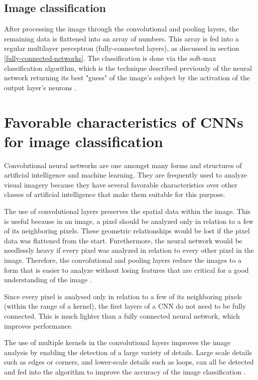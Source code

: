 \documentclass[12pt,a4paper,notitlepage]{article}
\begin{document}
\subsection{Image classification}
After processing the image through the convolutional and pooling layers, the remaining data is flattened into an array of numbers. This array is fed into a regular multilayer perceptron (fully-connected layers), as discussed in section \ref{fully-connected-networks}. The classification is done via the soft-max classification algorithm, which is the technique described previously of the neural network returning its best "guess" of the image's subject by the activation of the output layer's neurons \cite{rosebrock_softmax_2016}.

\section{Favorable characteristics of CNNs for image classification}
Convolutional neural networks are one amongst many forms and structures of artificial intelligence and machine learning. They are frequently used to analyze visual imagery because they have several favorable characteristics over other classes of artificial intelligence that make them suitable for this purpose.

The use of convolutional layers preserves the spatial data within the image. This is useful because in an image, a pixel should be analyzed only in relation to a few of its neighboring pixels. These geometric relationships would be lost if the pixel data was flattened from the start. Furethermore, the neural network would be needlessly heavy if every pixel was analyzed in relation to every other pixel in the image. Therefore, the convolutional and pooling layers reduce the images to a form that is easier to analyze without losing features that are critical for a good understanding of the image \cite{saha_comprehensive_2018}.

Since every pixel is analysed only in relation to a few of its neighboring pixels (within the range of a kernel), the first layers of a CNN do not need to be fully connected. This is much lighter than a fully connected neural network, which improves performance. \cite{aghdam_guide_2017}

The use of multiple kernels in the convolutional layers improves the image analysis by enabling the detection of a large variety of details. Large scale details such as edges or corners, and lower-scale details such as loops, can all be detected and fed into the algorithm to improve the accuracy of the image classification \cite{saha_comprehensive_2018}.
\end{document}
